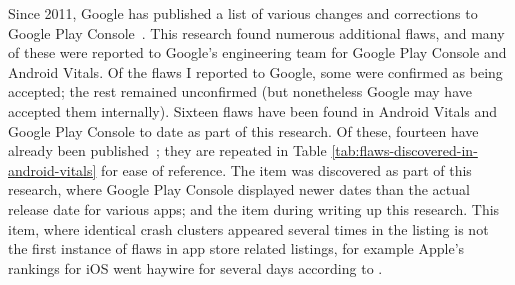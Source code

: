 Since 2011, Google has published a list of various changes and corrections to Google Play Console~. This research found numerous additional flaws, and many of these were reported to Google's engineering team for Google Play Console and Android Vitals. Of the flaws I reported to Google, some were confirmed as being accepted; the rest remained unconfirmed (but nonetheless Google may have accepted them internally).  %
Sixteen flaws have been found in Android Vitals and Google Play Console to date as part of this research. Of these, fourteen have already been published~; they are repeated in Table \ref{tab:flaws-discovered-in-android-vitals} for ease of reference. The  item was discovered as part of this research, where Google Play Console displayed newer dates than the actual release date for various apps; and the  item during writing up this research. This  item, where identical crash clusters appeared several times in the listing is not the first instance of flaws in app store related listings, for example Apple's rankings for iOS went haywire for several days according to .


